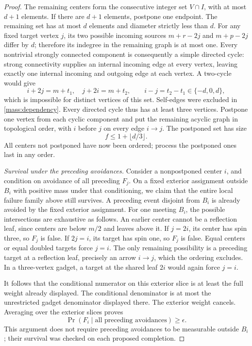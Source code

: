 \documentclass[11pt]{amsart}
\theoremstyle{definition}
\theoremstyle{remark}
\numberwithin{equation}{section}
\begin{document}
\begin{proof}
The remaining centers form the consecutive integer set $V\cap I$,
with at most $d+1$ elements. If there are $d+1$ elements, postpone one
endpoint. The remaining set has at most $d$ elements and diameter
strictly less than $d$. For any fixed target vertex $j$, its two
possible incoming sources $m+r-2j$ and $m+p-2j$ differ by $d$;
therefore its indegree in the remaining graph is at most one.
Every nontrivial strongly connected component is consequently a simple
directed cycle: strong connectivity supplies an internal incoming edge
at every vertex, leaving exactly one internal incoming and outgoing
edge at each vertex. A two-cycle would give
\[
 i+2j=m+t_1,\quad j+2i=m+t_2,
 \qquad i-j=t_2-t_1\in\{-d,0,d\},
\]
which is impossible for distinct vertices of this set. Self-edges were
excluded in \eqref{mass:dependency}. Every directed cycle thus has at
least three vertices. Postpone one vertex from each cyclic component
and put the remaining acyclic graph in topological order, with $i$
before $j$ on every edge $i\to j$. The postponed set has size
\[
 f\le 1+\lfloor d/3\rfloor.
\]
All centers not postponed have now been ordered; process the postponed
ones last in any order.

\emph{Survival under the preceding avoidances.}
Consider a nonpostponed center $i$, and condition on avoidance of all
preceding $F_j$. On a fixed exterior assignment outside $B_i$ with
positive mass under that conditioning, we claim that the entire local
failure family above still survives. A preceding event disjoint from
$B_i$ is already avoided by the fixed exterior assignment. For one
meeting $B_i$, the possible intersections are exhaustive as follows.
An earlier center cannot be a reflection leaf, since centers are below
$m/2$ and leaves above it. If $j=2i$, its center has spin three, so
$F_j$ is false. If $2j=i$, its target has spin one, so $F_j$ is false.
Equal centers or equal doubled targets force $j=i$. The only remaining
possibility is a preceding target at a reflection leaf, precisely an
arrow $i\to j$, which the ordering excludes. In a three-vertex gadget,
a target at the shared leaf $2i$ would again force $j=i$.

It follows that the conditional numerator on this exterior slice is
at least the full weight already displayed. The conditional denominator
is at most the unrestricted gadget denominator displayed there.
The exterior weight cancels. Averaging over the exterior slices proves
\[
 \Pr(F_i\mid\text{all preceding avoidances})\ge\epsilon.
\]
This argument does not require preceding avoidances to be measurable
outside $B_i$; their survival was checked on each proposed completion.


\end{proof}
\end{document}
